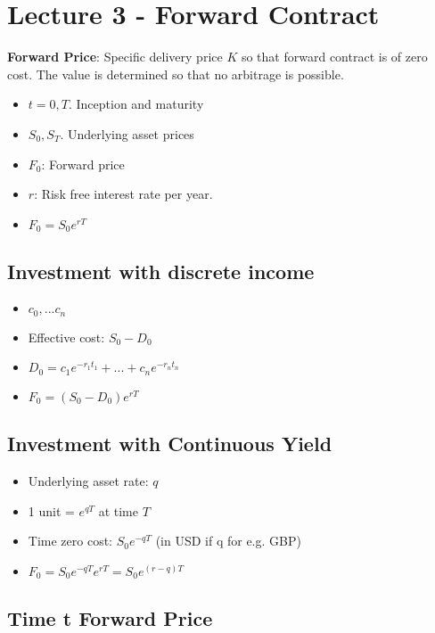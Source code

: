 \documentclass{article}
\begin{document}
\section*{Lecture 3 - Forward Contract}

\textbf{Forward Price}: Specific delivery price $K$ so that forward contract is of zero cost. The value is determined so that no arbitrage is possible. 

\begin{itemize}
	\item $t = 0, T$. Inception and maturity
	\item $S_0, S_T$. Underlying asset prices
	\item $F_0$: Forward price
	\item $r$: Risk free interest rate per year. 
	\item $F_0 = S_0e^{rT}$
\end{itemize}

\subsection*{Investment with discrete income}

\begin{itemize}
	\item $c_0, ... c_n$
	\item Effective cost: $S_0 - D_0$
	\item $D_0 = c_1 e^{-r_1t_1} + ... + c_ne^{-r_nt_n}$
	\item $F_0 = (S_0 - D_0)e^{rT}$
\end{itemize}

\subsection*{Investment with Continuous Yield}

\begin{itemize}
	\item Underlying asset rate: $q$	
	\item 1 unit = $e^{qT}$ at time $T$
	\item Time zero cost: $S_0 e^{-qT}$ (in USD if q for e.g. GBP)
	\item $F_0 = S_0 e^{-qT}e^{rT} = S_0 e^{(r-q)T}$
\end{itemize}

\subsection*{Time t Forward Price}
\end{document}
